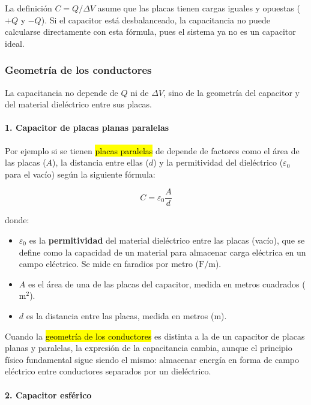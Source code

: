 La definición \( C = Q/\Delta V \) asume que las placas tienen cargas iguales y opuestas (\( +Q \) y \( -Q \)). Si el capacitor está desbalanceado, la capacitancia no puede calcularse directamente con esta fórmula, pues el sistema ya no es un capacitor ideal.

\subsubsection{Geometría de los conductores}

La capacitancia no depende de \(Q\) ni de \(\Delta V\), sino de la geometría del capacitor y del material dieléctrico entre sus placas.

\paragraph{1. Capacitor de placas planas paralelas}

Por ejemplo si se tienen \hl{placas paralelas} de depende de factores como el área de las placas (\(A\)), la distancia entre ellas (\(d\)) y la permitividad del dieléctrico (\( \varepsilon_0 \) para el vacío) según la siguiente fórmula:

\[
C = \varepsilon_0 \frac{A}{d}
\]

donde:
\begin{itemize}
    \item \( \varepsilon_0 \) es la \textbf{permitividad} del material dieléctrico entre las placas (vacío), que se define como la capacidad de un material para almacenar carga eléctrica en un campo eléctrico. Se mide en faradios por metro (\(\si{\farad\per\meter}\)).
    \item \( A \) es el área de una de las placas del capacitor, medida en metros cuadrados (\(\si{\meter\squared}\)).
    \item \( d \) es la distancia entre las placas, medida en metros (\(\si{\meter}\)).
\end{itemize}

Cuando la \hl{geometría de los conductores} es distinta a la de un capacitor de placas planas y paralelas, la expresión de la capacitancia cambia, aunque el principio físico fundamental sigue siendo el mismo: almacenar energía en forma de campo eléctrico entre conductores separados por un dieléctrico.

\paragraph{2. Capacitor esférico}

